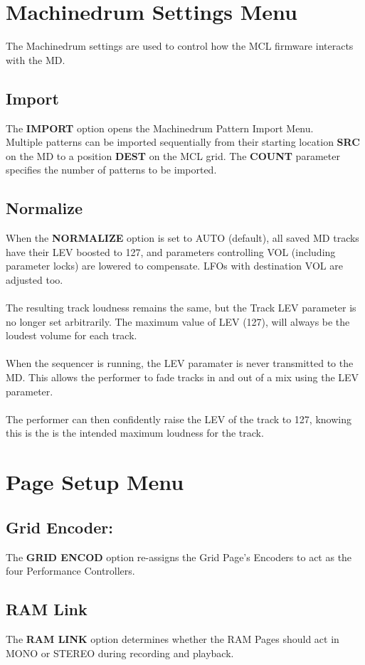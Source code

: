 \chapter{Machinedrum Settings Menu}
The Machinedrum settings are used to control how the MCL firmware interacts with the MD.
\section{Import}
The \textbf{IMPORT} option opens the Machinedrum Pattern Import Menu.\\ 
Multiple patterns can be imported sequentially from their starting location \textbf{SRC} on the MD to a position \textbf{DEST} on the MCL grid. The \textbf{COUNT} parameter specifies the number of patterns to be imported.
\section{Normalize}
When the \textbf{NORMALIZE} option is set to AUTO (default), all saved MD tracks have their LEV boosted to 127, and parameters controlling VOL (including parameter locks) are lowered
to compensate. LFOs with destination VOL are 
adjusted too.\\
\\
The resulting track loudness remains the same, but the Track LEV parameter is no longer set arbitrarily. The maximum value of LEV (127), will always be the loudest volume for each track.\\
\\
When the sequencer is running, the LEV paramater is never transmitted to the MD. This allows the performer to fade tracks in and out of a mix using the LEV parameter.\\
\\
The performer can then confidently raise the LEV of the track to 127, knowing this is the is the intended maximum loudness for the track.

\chapter{Page Setup Menu}
\section{Grid Encoder:}
The \textbf{GRID ENCOD} option re-assigns the Grid Page's Encoders to act as the four Performance Controllers.
\section{RAM Link}
The \textbf{RAM LINK} option determines whether the RAM Pages should act in MONO or STEREO during recording and playback.

